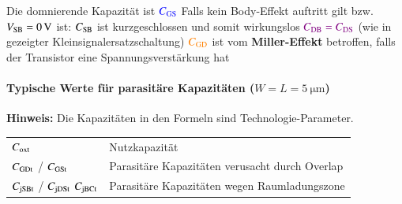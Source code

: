 \begin{outline}
    \1 Die domnierende Kapazität ist ${\color{blue} C_{\rm GS} }$
    \1 Falls kein Body-Effekt auftritt gilt bzw. $V_{\rm SB} = \qty{0}{\volt}$ ist:
        \2 $C_{\rm SB}$ ist kurzgeschlossen und somit wirkungslos
        \2 ${\color{violet} C_{\rm DB} = C_{\rm DS} }$ (wie in gezeigter Kleinsignalersatzschaltung)
    \1 ${\color{orange} C_{\rm GD} }$ ist vom \textbf{Miller-Effekt} betroffen, falls der Transistor eine Spannungsverstärkung hat
\end{outline}


\paragraph{Typische Werte für parasitäre Kapazitäten ($W = L = \qty{5}{\micro \meter}$)}


\medskip

\textbf{Hinweis:} Die Kapazitäten in den Formeln sind Technologie-Parameter.

\smallskip

\begin{tabular}{ll}
    $C_{\rm oxt}$                                   & Nutzkapazität                                     \\
    $C_{\rm GDt}$ / $C_{\rm GSt}$                   & Parasitäre Kapazitäten verusacht durch Overlap    \\
    $C_{\rm jSBt}$ / $C_{\rm jDSt}$ $C_{\rm jBCt}$  & Parasitäre Kapazitäten wegen Raumladungszone      \\
\end{tabular}



